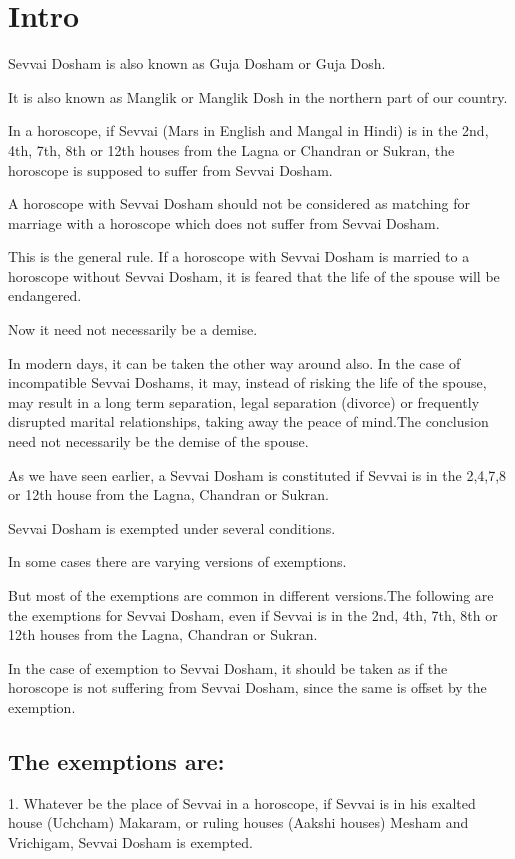\documentclass[12pt, right open]{memoir}
\begin{document}
\chapter{Intro}
Sevvai Dosham is also known as Guja Dosham or Guja Dosh. 

It is also known as Manglik or Manglik Dosh in the northern part of our country.

In a horoscope, if Sevvai (Mars in English and Mangal in Hindi) is in the 2nd, 4th, 7th, 8th or 12th houses from the Lagna or Chandran or Sukran, the horoscope is supposed to suffer from Sevvai Dosham.

A horoscope with Sevvai Dosham should not be considered as matching for marriage with a horoscope which does not suffer from Sevvai Dosham.

This is the general rule.  If a horoscope with Sevvai Dosham is married to a horoscope without Sevvai Dosham, it is feared that the life of the spouse will be endangered.

Now it need not necessarily be a demise.

In modern days, it can be taken the other way around also.  In the case of incompatible Sevvai Doshams, it may, instead of risking the life of the spouse, may result in a long term separation, legal separation (divorce) or frequently disrupted marital relationships, taking away the peace of mind.The conclusion need not necessarily be the demise of the spouse.

As we have seen earlier, a Sevvai Dosham is constituted if Sevvai is in the 2,4,7,8 or 12th house from the Lagna, Chandran or Sukran.

Sevvai Dosham is exempted under several conditions.  

In some cases there are varying versions of exemptions.  

But most of the exemptions are common in different versions.The following are the exemptions for Sevvai Dosham, even if Sevvai is in the 2nd, 4th, 7th, 8th or 12th houses from the Lagna, Chandran or Sukran. 

In the case of exemption to Sevvai Dosham, it should be taken as if the horoscope is not suffering from Sevvai Dosham, since the same is offset by the exemption.

\section{The exemptions are:}
1.  Whatever be the place of Sevvai in a horoscope, if Sevvai is in his exalted house (Uchcham) Makaram, or ruling houses (Aakshi houses) Mesham and Vrichigam, Sevvai Dosham is exempted.
\end{document}
